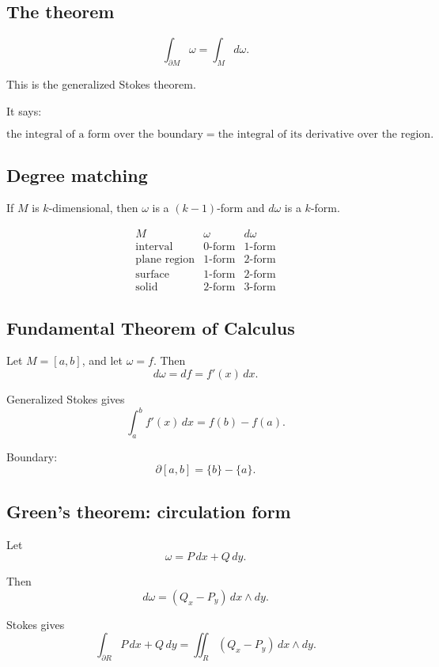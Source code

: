 \subsection*{The theorem}

\[
\boxed{
    \int_{\partial M}\omega
    =
    \int_M d\omega.
}
\]

This is the generalized Stokes theorem.

It says:

\[
\boxed{
    \text{the integral of a form over the boundary}
    =
    \text{the integral of its derivative over the region}.
}
\]

\subsection*{Degree matching}

If \(M\) is \(k\)-dimensional, then \(\omega\) is a \((k-1)\)-form and \(d\omega\) is a
\(k\)-form.

\[
\begin{array}{c|c|c}
M & \omega & d\omega \\ \hline
\text{interval} & 0\text{-form} & 1\text{-form}\\[1mm]
\text{plane region} & 1\text{-form} & 2\text{-form}\\[1mm]
\text{surface} & 1\text{-form} & 2\text{-form}\\[1mm]
\text{solid} & 2\text{-form} & 3\text{-form}
\end{array}
\]

\subsection*{Fundamental Theorem of Calculus}

Let \(M=[a,b]\), and let \(\omega=f\).  Then
\[
    d\omega=df=f'(x)\,dx.
\]

Generalized Stokes gives
\[
\boxed{
    \int_a^b f'(x)\,dx=f(b)-f(a).
}
\]

Boundary:
\[
\boxed{
    \partial[a,b]=\{b\}-\{a\}.
}
\]

\subsection*{Green's theorem: circulation form}

Let
\[
    \omega=P\,dx+Q\,dy.
\]

Then
\[
    d\omega=(Q_x-P_y)\,dx\wedge dy.
\]

Stokes gives
\[
\boxed{
    \int_{\partial R}P\,dx+Q\,dy
    =
    \iint_R (Q_x-P_y)\,dx\wedge dy.
}
\]

